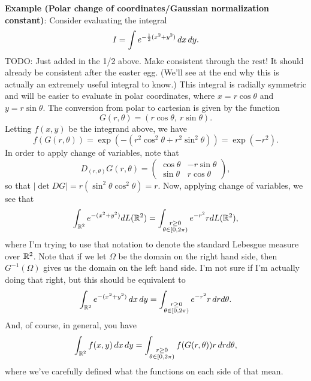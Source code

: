 \vspace{1em}
\noindent
\textbf{Example (Polar change of coordinates/Gaussian normalization constant)}: 
Consider evaluating the integral 
\begin{equation}\label{eq:gauss-soln-step}
I = \int e^{-\frac{1}{2}(x^2 + y^2)} \, dx \, dy. 
\end{equation}
TODO: Just added in the 1/2 above. Make consistent through the rest! It should already be consistent after the easter egg. 
(We'll see at the end why this is actually an extremely useful integral to know.) This integral is radially symmetric and will be easier to evaluate in polar coordinates, where $x = r\cos\theta$ and $y=r\sin\theta$. 
The conversion from polar to cartesian is given by the function
$$
G(r, \theta) = (r\cos \theta, ~r\sin \theta). 
$$
Letting $f(x,y)$ be the integrand above, we have
$$
f(G(r,\theta)) = \exp( -(r^2\cos^2\theta + r^2 \sin^2 \theta)) = \exp(-r^2).
$$
In order to apply change of variables, note that 
$$
D_{(r,\theta)} G(r,\theta) = 
\begin{pmatrix}
\cos\theta & -r\sin\theta\\
\sin\theta & r\cos\theta
\end{pmatrix},
$$
so that $|\det D G| = r(\sin^2\theta \cos^2\theta) = r$. Now, applying change of variables, we see that
$$
\int_{\mathbb{R}^2} e^{-(x^2 + y^2)} dL(\mathbb{R}^2) = \int_{\substack{r \geq 0\\ \theta \in [0, 2\pi)}} e^{-r^2} r dL(\mathbb{R}^2),
$$
where I'm trying to use that notation to denote the standard Lebesgue measure over $\mathbb{R}^2$. Note that if we let $\Omega$ be the domain on the right hand side, then $G^{-1}(\Omega)$ gives us the domain on the left hand side. I'm not sure if I'm actually doing that right, but this should be equivalent to
$$
\int_{\mathbb{R}^2} e^{-(x^2 + y^2)} \, dx \, dy = \int_{\substack{r \geq 0\\ \theta \in [0, 2\pi)}} e^{-r^2} r \, dr d\theta.
$$
And, of course, in general, you have
$$
\int_{\mathbb{R}^2} f(x,y) \, dx \, dy = \int_{\substack{r \geq 0\\ \theta \in [0, 2\pi)}} f(G(r,\theta)) r \, dr d\theta,
$$
where we've carefully defined what the functions on each side of that mean. 

